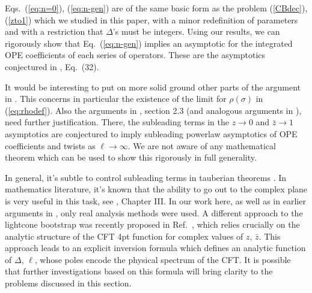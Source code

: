 \documentclass[12pt]{article}
\newcommand{\reef}[1]{(\ref{#1})}
\numberwithin{equation}{section}
\begin{document}
Eqs.~\reef{eq:n=0}, \reef{eq:n-gen} are of the same basic form as the problem \reef{CBdec}, \reef{zto1} which we studied in this paper, with a minor redefinition of parameters and with a restriction that $\Delta$'s must be integers. Using our results, we can rigorously show that Eq.~\reef{eq:n-gen} implies an asymptotic for the integrated OPE coefficients of each series of operators. These are the asymptotics conjectured in \cite{Fitzpatrick:2012yx}, Eq.~(32).

It would be interesting to put on more solid ground other parts of the argument in \cite{Fitzpatrick:2012yx}. This concerns in particular the existence of the limit for $\rho(\sigma)$ in \reef{eq:rhodef}. Also the arguments in \cite{Fitzpatrick:2012yx}, section 2.3 (and analogous arguments in \cite{Komargodski:2012ek}), need further justification. There, the subleading terms in the $z\to0$ and $\bar z\to 1$ asymptotics are conjectured to imply subleading powerlaw asymptotics of OPE coefficients and twists as $\ell\to\infty$. We are not aware of any mathematical theorem which can be used to show this rigorously in full generality. 


In general, it's subtle to control subleading terms in tauberian theorems \cite{Korevaar}. In mathematics literature, it's known that the ability to go out to the complex plane is very useful in this task, see \cite{Korevaar}, Chapter III. In our work here, as well as in earlier arguments in \cite{Fitzpatrick:2012yx,Komargodski:2012ek}, only real analysis methods were used. A different approach to the lightcone bootstrap was recently proposed in Ref.~\cite{Caron-Huot:2017vep}, which relies crucially on the analytic structure of the CFT 4pt function for complex values of $z$, $\bar z$. This approach leads to an explicit inversion formula which defines an analytic function of $\Delta$, $\ell$, whose poles encode the physical spectrum of the CFT. It is possible that further investigations based on this formula will bring clarity to the problems discussed in this section. 

\small 


\end{document}
